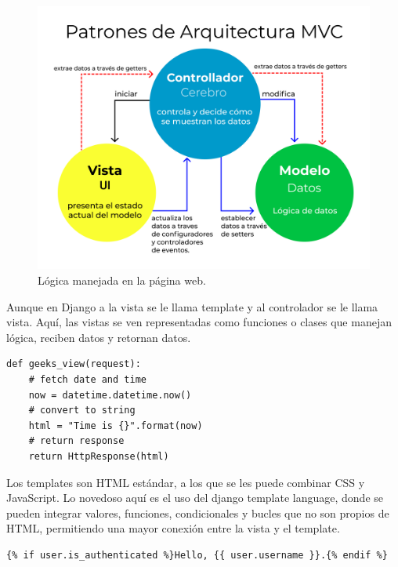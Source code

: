 \begin{figure}[H]
    \centering
    \includegraphics[width=1\linewidth]{web/MVC3.png}
    \caption{Lógica manejada en la página web.}
    \label{fig:arch-mvc}
\end{figure}

Aunque en Django a la vista se le llama template y al controlador se le llama vista.
Aquí, las vistas se ven representadas como funciones o clases que manejan lógica, reciben datos y retornan datos.\\

\begin{listing}[H]
\begin{verbatim}
def geeks_view(request):
    # fetch date and time
    now = datetime.datetime.now()
    # convert to string
    html = "Time is {}".format(now)
    # return response
    return HttpResponse(html)
\end{verbatim}
\caption{Ejemplo de vista django}
\label{listing:vista-ejemplo}
\end{listing}

Los templates son HTML estándar, a los que se les puede combinar CSS y JavaScript. Lo novedoso aquí es el uso del django template language, donde se pueden integrar valores, funciones, condicionales y bucles que no son propios de HTML, permitiendo una mayor conexión entre la vista y el template.\\

\begin{listing}[H]
\begin{verbatim}
{% if user.is_authenticated %}Hello, {{ user.username }}.{% endif %}
\end{verbatim}
\caption{Ejemplo de un if en django template language en un HTML.}
\label{listing:django-template-ejemplo}
\end{listing}

